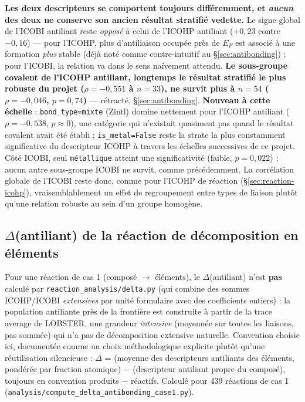 \documentclass[11pt,a4paper]{article}
\begin{document}
\textbf{Les deux descripteurs se comportent toujours différemment, et
\emph{aucun} des deux ne conserve son ancien résultat stratifié
vedette.} Le signe global de l'ICOBI antiliant reste \emph{opposé} à
celui de l'ICOHP antiliant ($+0{,}23$ contre $-0{,}16$) --- pour
l'ICOHP, plus d'antiliaison occupée près de $E_F$ est associé à une
formation \emph{plus} stable (déjà noté comme contre-intuitif au
\S\ref{sec:antibonding}) ; pour l'ICOBI, la relation va dans le sens
naïvement attendu. \textbf{Le sous-groupe covalent de l'ICOHP
antiliant, longtemps le résultat stratifié le plus robuste du projet
($\rho=-0{,}551$ à $n=33$), ne survit plus à $n=54$
($\rho=-0{,}046$, $p=0{,}74$)} --- rétracté, \S\ref{sec:antibonding}.
\textbf{Nouveau à cette échelle} : \texttt{bond\_type=mixte} (Zintl)
domine nettement pour l'ICOHP antiliant ($\rho=-0{,}538$,
$p\approx0$), une catégorie qui n'existait quasiment pas quand le
résultat covalent avait été établi ; \texttt{is\_metal=False} reste la
strate la plus constamment significative du descripteur ICOHP à travers
les échelles successives de ce projet. Côté ICOBI, seul
\texttt{métallique} atteint une significativité (faible, $p=0{,}022$) ;
aucun autre sous-groupe ICOBI ne survit, comme précédemment. La
corrélation globale de l'ICOBI reste donc, comme pour l'ICOHP de
réaction (\S\ref{sec:reaction-icohp}), vraisemblablement un effet de
regroupement entre types de liaison plutôt qu'une relation robuste au
sein d'un groupe homogène.

\subsection{$\Delta$(antiliant) de la réaction de décomposition en éléments}

Pour une réaction de cas 1 (composé $\to$ éléments), le
$\Delta$(antiliant) n'est \textbf{pas} calculé par
\texttt{reaction\_analysis/delta.py} (qui combine des sommes ICOHP/ICOBI
\emph{extensives} par unité formulaire avec des coefficients entiers) :
la population antiliante près de la frontière est construite à partir de
la trace \og{}average\fg{} de LOBSTER, une grandeur \emph{intensive}
(moyennée sur toutes les liaisons, pas sommée) qui n'a pas de
décomposition extensive naturelle. Convention choisie ici, documentée
comme un choix méthodologique explicite plutôt qu'une réutilisation
silencieuse : $\Delta$ = (moyenne des descripteurs antiliants des
éléments, pondérée par fraction atomique) $-$ (descripteur antiliant
propre du composé), toujours en convention produits $-$ réactifs.
Calculé pour 439 réactions de cas 1
(\texttt{analysis/compute\_delta\_antibonding\_case1.py}).
\end{document}
